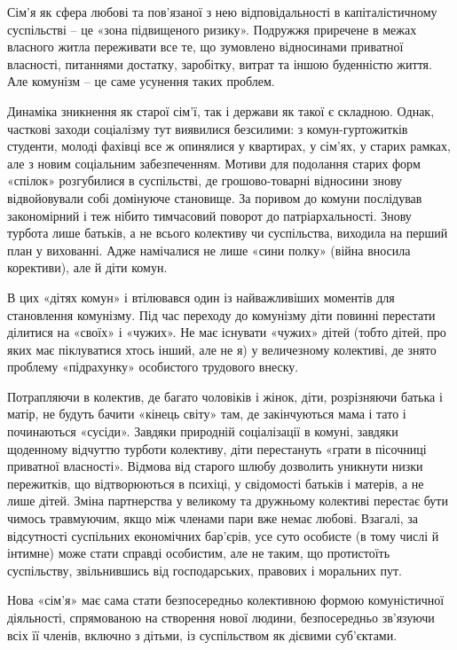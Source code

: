 \documentclass[../main]{subfiles}
\begin{document}
Сім’я як сфера любові та пов’язаної з нею відповідальності в капіталістичному суспільстві – це «зона підвищеного ризику». Подружжя приречене в межах власного житла переживати все те, що зумовлено відносинами приватної власності, питаннями достатку, заробітку, витрат та іншою буденністю життя. Але комунізм – це саме усунення таких проблем.

Динаміка зникнення як старої сім’ї, так і держави як такої є складною. Однак, часткові заходи соціалізму тут виявилися безсилими: з комун-гуртожитків студенти, молоді фахівці все ж опинялися у квартирах, у сім’ях, у старих рамках, але з новим соціальним забезпеченням. Мотиви для подолання старих форм «спілок» розгубилися в суспільстві, де грошово-товарні відносини знову відвойовували собі домінуюче становище. За поривом до комуни послідував закономірний і теж нібито тимчасовий поворот до патріархальності. Знову турбота лише батьків, а не всього колективу чи суспільства, виходила на перший план у вихованні. Адже намічалися не лише «сини полку» (війна вносила корективи), але й діти комун.

В цих «дітях комун» і втілювався один із найважливіших моментів для становлення комунізму. Під час переходу до комунізму діти повинні перестати ділитися на «своїх» і «чужих». Не має існувати «чужих» дітей (тобто дітей, про яких має піклуватися хтось інший, але не я) у величезному колективі, де знято проблему «підрахунку» особистого трудового внеску.

Потрапляючи в колектив, де багато чоловіків і жінок, діти, розрізняючи батька і матір, не будуть бачити «кінець світу» там, де закінчуються мама і тато і починаються «сусіди». Завдяки природній соціалізації в комуні, завдяки щоденному відчуттю турботи колективу, діти перестануть «грати в пісочниці приватної власності». Відмова від старого шлюбу дозволить уникнути низки пережитків, що відтворюються в психіці, у свідомості батьків і матерів, а не лише дітей. Зміна партнерства у великому та дружньому колективі перестає бути чимось травмуючим, якщо між членами пари вже немає любові. Взагалі, за відсутності суспільних економічних бар’єрів, усе суто особисте (в тому числі й інтимне) може стати справді особистим, але не таким, що протистоїть суспільству, звільнившись від господарських, правових і моральних пут.

Нова «сім’я» має сама стати безпосередньо колективною формою комуністичної діяльності, спрямованою на створення нової людини, безпосередньо зв’язуючи всіх її членів, включно з дітьми, із суспільством як дієвими суб’єктами.
\end{document}
